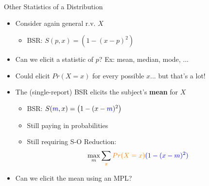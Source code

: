 \begin{frame}{Other Statistics of a Distribution}
\begin{itemize}
    \item Consider again general r.v. $X$
    \begin{itemize}
        \item BSR: $S(p,x)=\left(1-(x-p)^2\right)$
    \end{itemize}
    \item Can we elicit a statistic of $p$? Ex: mean, median, mode, ...
    \item Could elicit $Pr(X=x)$ for every possible $x$... but that's a lot!
    \item The (single-report) BSR elicits the subject's \textbf{mean} for $X$
    \begin{itemize}
        \item BSR: $S({\color{blue}m},x)=\left(1-(x-{\color{blue}m})^2\right)$
        \item Still paying in probabilities
        \item Still requiring {\color{orange}S}-{\color{blue}O} Reduction:
        $$
            \max_m \sum_{{\color{orange}x}} \color{orange}Pr(X=x)\color{blue}(1-(x-m)^2)
        $$
    \end{itemize}
    \item Can we elicit the mean using an MPL?
\end{itemize}
\end{frame}

